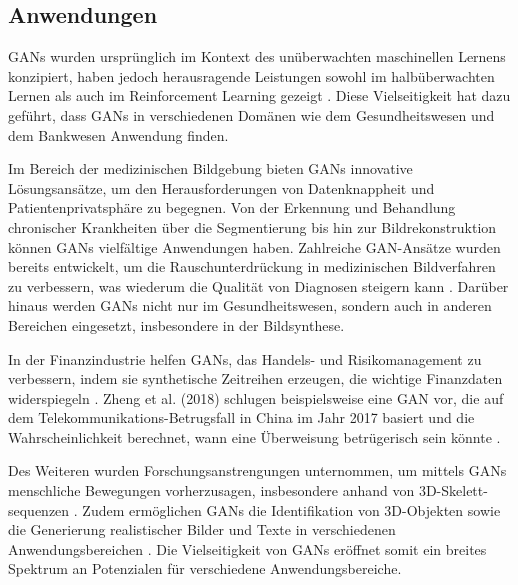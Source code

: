 \subsection{Anwendungen}
GANs wurden ursprünglich im Kontext des unüberwachten maschinellen Lernens konzipiert, haben jedoch herausragende Leistungen sowohl im halbüberwachten Lernen als auch im Reinforcement Learning gezeigt \cite{Aggarwal.2021}. Diese Vielseitigkeit hat dazu geführt, dass GANs in verschiedenen Domänen wie dem Gesundheitswesen und dem Bankwesen Anwendung finden.

Im Bereich der medizinischen Bildgebung bieten GANs innovative Lösungsansätze, um den Herausforderungen von Datenknappheit und Patientenprivatsphäre zu begegnen. Von der Erkennung und Behandlung chronischer Krankheiten über die Segmentierung bis hin zur Bildrekonstruktion können GANs vielfältige Anwendungen haben. Zahlreiche GAN-Ansätze wurden bereits entwickelt, um die Rauschunterdrückung in medizinischen Bildverfahren zu verbessern, was wiederum die Qualität von Diagnosen steigern kann \cite{Yi.2019}. Darüber hinaus werden GANs nicht nur im Gesundheitswesen, sondern auch in anderen Bereichen eingesetzt, insbesondere in der Bildsynthese. 

In der Finanzindustrie helfen GANs, das Handels- und Risikomanagement zu verbessern, indem sie synthetische Zeitreihen erzeugen, die wichtige Finanzdaten widerspiegeln \cite{Eckerli.2021}. Zheng et al. (2018) schlugen beispielsweise eine GAN vor, die auf dem Telekommunikations-Betrugsfall in China im Jahr 2017 basiert und die Wahrscheinlichkeit berechnet, wann eine Überweisung betrügerisch sein könnte \cite{Zheng.2018}. 

Des Weiteren wurden Forschungsanstrengungen unternommen, um mittels GANs menschliche Bewegungen vorherzusagen, insbesondere anhand von 3D-Skelett-\\sequenzen \cite{Jain.2020}. Zudem ermöglichen GANs die Identifikation von 3D-Objekten sowie die Generierung realistischer Bilder und Texte in verschiedenen Anwendungsbereichen \cite{Aggarwal.2021}.
Die Vielseitigkeit von GANs eröffnet somit ein breites Spektrum an Potenzialen für verschiedene Anwendungsbereiche.

